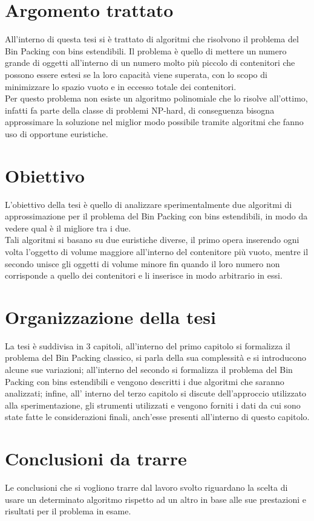 {}
\section*{Argomento trattato}
All'interno di questa tesi si è trattato di algoritmi che risolvono il problema del Bin Packing con 
bins estendibili. Il problema è quello di mettere un numero grande di oggetti all'interno di 
un numero molto più piccolo di contenitori che possono essere estesi se la loro capacità viene superata, con lo scopo 
di minimizzare lo spazio vuoto e in eccesso totale dei contenitori. \\
Per questo problema non esiste un algoritmo polinomiale che lo risolve all'ottimo, infatti fa parte della
classe di problemi NP-hard, di conseguenza bisogna approssimare la soluzione nel miglior modo
possibile tramite algoritmi che fanno uso di opportune euristiche.

{}
\section*{Obiettivo}
L'obiettivo della tesi è quello di analizzare sperimentalmente due algoritmi di approssimazione 
per il problema del Bin Packing con bins estendibili, in modo da vedere qual è il migliore tra i due. \\
Tali algoritmi si basano su due euristiche diverse, il primo opera inserendo ogni volta l'oggetto di volume 
maggiore all'interno del contenitore più vuoto, mentre il secondo unisce gli oggetti di volume minore 
fin quando il loro numero non corrisponde a quello dei contenitori e li inserisce in modo arbitrario in essi.

{}
\section*{Organizzazione della tesi}
La tesi è suddivisa in 3 capitoli, all'interno del primo capitolo si formalizza il problema del Bin Packing
classico, si parla della sua complessità e si introducono alcune sue variazioni; all'interno del secondo si formalizza
il problema del Bin Packing con bins estendibili e vengono descritti i due algoritmi che saranno analizzati; infine, all'
interno del terzo capitolo si discute dell'approccio utilizzato alla sperimentazione, gli strumenti utilizzati e vengono forniti i dati
da cui sono state fatte le considerazioni finali, anch'esse presenti all'interno di questo capitolo.

{}
\section*{Conclusioni da trarre}
Le conclusioni che si vogliono trarre dal lavoro svolto riguardano la scelta di usare un determinato
algoritmo rispetto ad un altro in base alle sue prestazioni e risultati per il problema in esame.